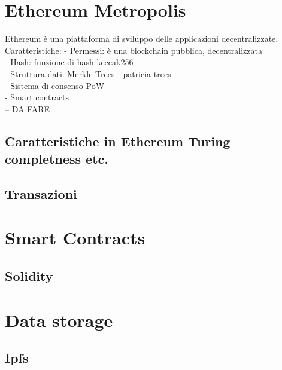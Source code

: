 \section{Ethereum Metropolis}

Ethereum è una piattaforma di sviluppo delle applicazioni decentralizzate. Caratteristiche: 
- Permessi: è una blockchain pubblica, decentralizzata\\
- Hash: funzione di hash keccak256\\
- Struttura dati: Merkle Trees - patricia trees\\
- Sistema di consenso PoW\\
- Smart contracts\\
-- DA FARE\\

\subsection{Caratteristiche in Ethereum Turing completness etc.}

\subsection{Transazioni}

\section{Smart Contracts}

\blindtext

\subsection{Solidity}

\blindtext

\section{Data storage}

\blindtext

\subsection{Ipfs}

\blindtext
